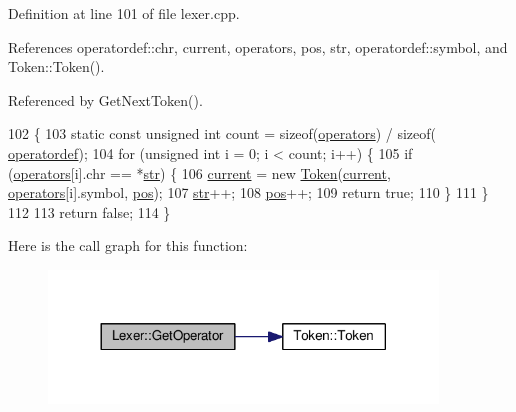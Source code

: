 Definition at line 101 of file lexer.\+cpp.



References operatordef\+::chr, current, operators, pos, str, operatordef\+::symbol, and Token\+::\+Token().



Referenced by Get\+Next\+Token().


\begin{DoxyCode}
102 \{
103     \textcolor{keyword}{static} \textcolor{keyword}{const} \textcolor{keywordtype}{unsigned} \textcolor{keywordtype}{int} count = \textcolor{keyword}{sizeof}(\hyperlink{lex_8h_aaa2a2d46273713612114ac54f424c653}{operators}) / \textcolor{keyword}{sizeof}(
      \hyperlink{structoperatordef}{operatordef});
104     \textcolor{keywordflow}{for} (\textcolor{keywordtype}{unsigned} \textcolor{keywordtype}{int} i = 0; i < count; i++) \{
105         \textcolor{keywordflow}{if} (\hyperlink{lex_8h_aaa2a2d46273713612114ac54f424c653}{operators}[i].chr == *\hyperlink{classLexer_ab2ebe8e8906184cb2e58ec6779c5f9e7}{str}) \{
106             \hyperlink{classLexer_a64f66ae0d280ab2d4f4b8e2ac5d8c4c5}{current} = \textcolor{keyword}{new} \hyperlink{structToken}{Token}(\hyperlink{classLexer_a64f66ae0d280ab2d4f4b8e2ac5d8c4c5}{current}, \hyperlink{lex_8h_aaa2a2d46273713612114ac54f424c653}{operators}[i].symbol, 
      \hyperlink{classLexer_a91a95d9b5edaf25f634fabecaf7f40b5}{pos});
107             \hyperlink{classLexer_ab2ebe8e8906184cb2e58ec6779c5f9e7}{str}++;
108             \hyperlink{classLexer_a91a95d9b5edaf25f634fabecaf7f40b5}{pos}++;
109             \textcolor{keywordflow}{return} \textcolor{keyword}{true};
110         \}
111     \}
112 
113     \textcolor{keywordflow}{return} \textcolor{keyword}{false};
114 \}
\end{DoxyCode}


Here is the call graph for this function\+:
\nopagebreak
\begin{figure}[H]
\begin{center}
\leavevmode
\includegraphics[width=293pt]{d6/dc0/classLexer_a6d8ab3a715307bf89fdfa8f83879c3cf_cgraph}
\end{center}
\end{figure}





